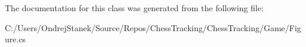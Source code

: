 The documentation for this class was generated from the following file\+:\begin{DoxyCompactItemize}
\item 
C\+:/\+Users/\+Ondrej\+Stanek/\+Source/\+Repos/\+Chess\+Tracking/\+Chess\+Tracking/\+Game/Figure.\+cs\end{DoxyCompactItemize}
